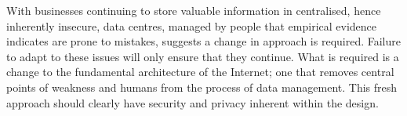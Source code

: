 \documentclass[twocolumn,english]{article}
\begin{document}
With businesses continuing to store valuable information in centralised, hence inherently insecure, data centres, managed by people that empirical evidence indicates are prone to mistakes, suggests a change in approach is required. Failure
to adapt to these issues will only ensure that they continue. What is required is a change to the fundamental architecture
of the Internet; one that removes central points of weakness and humans
from the process of data management. This fresh approach should clearly
have security and privacy inherent within the design. 

%
%
%
%
%
%
%
\end{document}
